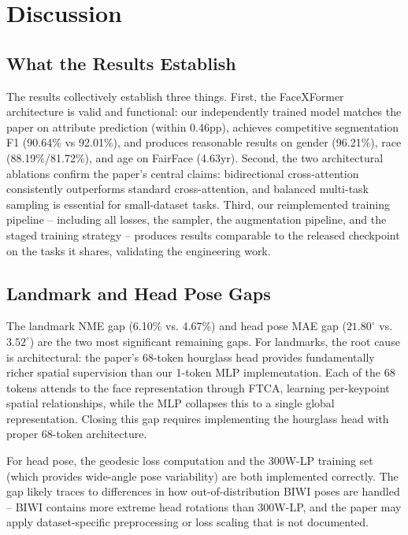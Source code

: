 \documentclass[11pt]{article}
\begin{document}
\section{Discussion}



\subsection{What the Results Establish}

The results collectively establish three things. First, the FaceXFormer architecture is valid and functional: our independently trained model matches the paper on attribute prediction (within 0.46pp), achieves competitive segmentation F1 (90.64\% vs 92.01\%), and produces reasonable results on gender (96.21\%), race (88.19\%/81.72\%), and age on FairFace (4.63yr). Second, the two architectural ablations confirm the paper's central claims: bidirectional cross-attention consistently outperforms standard cross-attention, and balanced multi-task sampling is essential for small-dataset tasks. Third, our reimplemented training pipeline -- including all losses, the sampler, the augmentation pipeline, and the staged training strategy -- produces results comparable to the released checkpoint on the tasks it shares, validating the engineering work.



\subsection{Landmark and Head Pose Gaps}

The landmark NME gap (6.10\% vs. 4.67\%) and head pose MAE gap ($21.80^\circ$ vs. $3.52^\circ$) are the two most significant remaining gaps. For landmarks, the root cause is architectural: the paper's 68-token hourglass head provides fundamentally richer spatial supervision than our 1-token MLP implementation. Each of the 68 tokens attends to the face representation through FTCA, learning per-keypoint spatial relationships, while the MLP collapses this to a single global representation. Closing this gap requires implementing the hourglass head with proper 68-token architecture.

For head pose, the geodesic loss computation and the 300W-LP training set (which provides wide-angle pose variability) are both implemented correctly. The gap likely traces to differences in how out-of-distribution BIWI poses are handled -- BIWI contains more extreme head rotations than 300W-LP, and the paper may apply dataset-specific preprocessing or loss scaling that is not documented.
\end{document}
